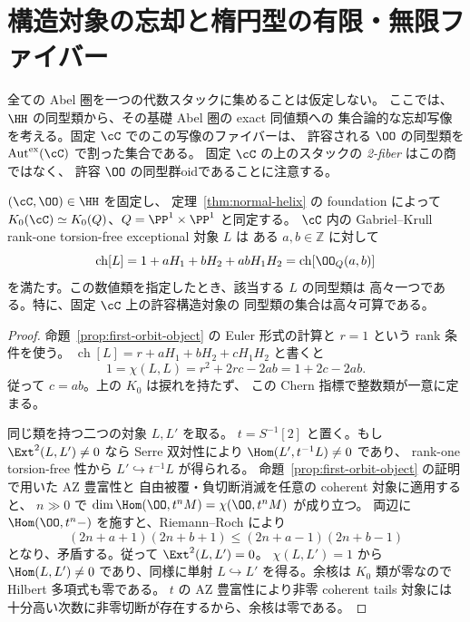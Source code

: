 \section{構造対象の忘却と楕円型の有限・無限ファイバー}
\label{sec:unpointed-elliptic-fiber}

全ての Abel 圏を一つの代数スタックに集めることは仮定しない。
ここでは、$\HH$ の同型類から、その基礎 Abel 圏の exact 同値類への
集合論的な忘却写像を考える。固定 $\cC$ でのこの写像のファイバーは、
許容される $\OO$ の同型類を
$\operatorname{Aut}^{\mathrm{ex}}(\cC)$ で割った集合である。
固定 $\cC$ の上のスタックの \emph{2-fiber} はこの商ではなく、
許容 $\OO$ の同型群oidであることに注意する。

\begin{lemma}[許容構造対象の数値類と一意性]
\label{lem:forgetting-numerical-rigidity}
$(\cC,\OO)\in\HH$ を固定し、
定理~\ref{thm:normal-helix} の foundation によって
$K_0(\cC)\simeq K_0(Q)$、$Q=\PP^1\times\PP^1$ と同定する。
$\cC$ 内の Gabriel--Krull rank-one torsion-free exceptional 対象 $L$ は
ある $a,b\in\mathbb Z$ に対して
\[
 \operatorname{ch}[L]
 =1+aH_1+bH_2+abH_1H_2
 =\operatorname{ch}[\OO_Q(a,b)]
\]
を満たす。この数値類を指定したとき、該当する $L$ の同型類は
高々一つである。特に、固定 $\cC$ 上の許容構造対象の
同型類の集合は高々可算である。
\end{lemma}
\begin{proof}
命題~\ref{prop:first-orbit-object} の Euler 形式の計算と
$r=1$ という rank 条件を使う。
$\operatorname{ch}[L]=r+aH_1+bH_2+cH_1H_2$ と書くと
\[
 1=\chi(L,L)=r^2+2rc-2ab=1+2c-2ab.
\]
従って $c=ab$。上の $K_0$ は捩れを持たず、
この Chern 指標で整数類が一意に定まる。

同じ類を持つ二つの対象 $L,L'$ を取る。
$t=S^{-1}[2]$ と置く。もし $\Ext^2(L,L')\ne0$ なら
Serre 双対性により $\Hom(L',t^{-1}L)\ne0$ であり、
rank-one torsion-free 性から $L'\hookrightarrow t^{-1}L$ が得られる。
命題~\ref{prop:first-orbit-object} の証明で用いた AZ 豊富性と
自由被覆・負切断消滅を任意の coherent 対象に適用すると、
$n\gg0$ で
$\dim\Hom(\OO,t^n M)=\chi(\OO,t^nM)$ が成り立つ。
両辺に $\Hom(\OO,t^n-)$ を施すと、Riemann--Roch により
\[
 (2n+a+1)(2n+b+1)
 \le(2n+a-1)(2n+b-1)
\]
となり、矛盾する。従って $\Ext^2(L,L')=0$。
$\chi(L,L')=1$ から $\Hom(L,L')\ne0$ であり、同様に単射
$L\hookrightarrow L'$ を得る。余核は $K_0$ 類が零なので
Hilbert 多項式も零である。
$t$ の AZ 豊富性により非零 coherent tails 対象には
十分高い次数に非零切断が存在するから、余核は零である。
\end{proof}


